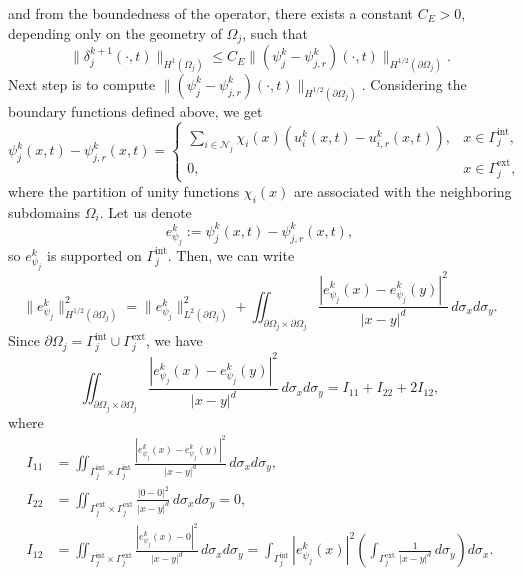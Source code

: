 \documentclass[a4paper, 11pt]{article}
\theoremstyle{remark}
\begin{document}
and from the boundedness of the operator, there exists a constant $C_{E}>0$, depending only on the geometry of $\Omega_{j}$, such that
\begin{equation*}
    \lVert\delta_{j}^{k+1}(\cdot, t)\rVert_{H^{1}(\Omega_{j})} \leq C_{E}\lVert(\psi_{j}^{k} - \psi_{j, r}^{k})(\cdot, t)\rVert_{H^{1/2}(\partial\Omega_{j})}.
\end{equation*}
Next step is to compute $\lVert(\psi_{j}^{k} - \psi_{j, r}^{k})(\cdot, t)\rVert_{H^{1/2}(\partial\Omega_{j})}$. 
Considering the boundary functions defined above, we get
\begin{equation*}
    \psi_{j}^{k}(x, t) - \psi_{j,r}^{k}(x, t) = 
    \begin{cases}
        \sum_{i\in\mathcal{N}_{j}}\chi_{i}(x)\left(u_{i}^{k}(x, t) - u_{i, r}^{k}(x, t)\right), & x\in \Gamma_{j}^{\text{int}},\\
        0, & x\in \Gamma_{j}^{\text{ext}},
    \end{cases}
\end{equation*}
where the partition of unity functions $\chi_{i}(x)$ are associated with the neighboring subdomains $\Omega_i$. Let us denote
\begin{equation*}
    e_{\psi_{j}}^{k} := \psi_{j}^{k}(x, t) - \psi_{j,r}^{k}(x, t),
\end{equation*}
so $e_{\psi_{j}}^{k}$ is supported on $\Gamma_{j}^{\text{int}}$. Then, we can write
\begin{equation*}
\|e_{\psi_{j}}^{k}\|_{H^{1/2}(\partial\Omega_j)}^2 = \|e_{\psi_{j}}^{k}\|_{L^2(\partial\Omega_j)}^2 + \iint_{\partial\Omega_j \times \partial\Omega_j}
\frac{|e_{\psi_{j}}^{k}(x)-e_{\psi_{j}}^{k}(y)|^2}{|x-y|^{d}} \, d\sigma_x d\sigma_y.
\end{equation*}
Since $\partial\Omega_{j} = \Gamma_j^{\text{int}} \cup \Gamma_j^{\text{ext}}$, we have
\begin{equation*}
\iint_{\partial\Omega_j \times \partial\Omega_j} \frac{|e_{\psi_{j}}^{k}(x)-e_{\psi_{j}}^{k}(y)|^2}{|x-y|^{d}} \, d\sigma_x d\sigma_y = I_{11} + I_{22} + 2 I_{12},
\end{equation*}
where 
\begin{align*}
I_{11} &= \iint_{\Gamma_j^{\text{int}} \times \Gamma_j^{\text{int}}} \frac{|e_{\psi_{j}}^{k}(x)-e_{\psi_{j}}^{k}(y)|^2}{|x-y|^{d}} \, d\sigma_x d\sigma_y,\\
I_{22} &= \iint_{\Gamma_j^{\text{ext}} \times \Gamma_j^{\text{ext}}}\frac{|0-0|^2}{|x-y|^{d}} \, d\sigma_x d\sigma_y = 0,\\
I_{12} &= \iint_{\Gamma_j^{\text{int}} \times \Gamma_j^{\text{ext}}} \frac{|e_{\psi_{j}}^{k}(x)-0|^2}{|x-y|^{d}} \, d\sigma_x d\sigma_y = 
\int_{\Gamma_j^{\text{int}}} |e_{\psi_{j}}^{k}(x)|^2 \left( \int_{\Gamma_j^{\text{ext}}} \frac{1}{|x-y|^{d}} \, d\sigma_y \right) d\sigma_x.
\end{align*}
\end{document}
